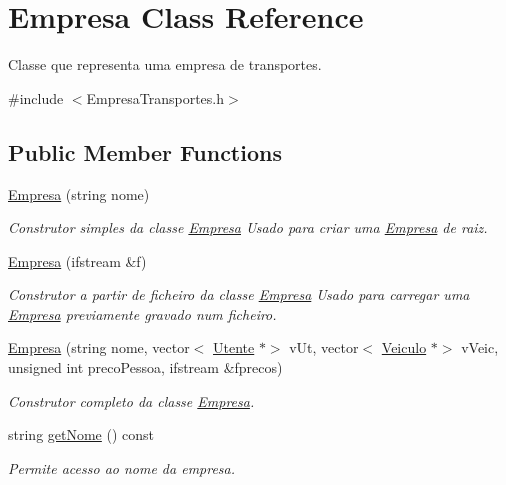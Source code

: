 \hypertarget{class_empresa}{}\section{Empresa Class Reference}
\label{class_empresa}


Classe que representa uma empresa de transportes.  




{\ttfamily \#include $<$Empresa\+Transportes.\+h$>$}

\subsection*{Public Member Functions}
\begin{DoxyCompactItemize}
\item 
\mbox{\hyperlink{class_empresa_ac5bccaf3758b25fea4803a63d4362236}{Empresa}} (string nome)
\begin{DoxyCompactList}\small\item\em Construtor simples da classe \mbox{\hyperlink{class_empresa}{Empresa}} Usado para criar uma \mbox{\hyperlink{class_empresa}{Empresa}} de raiz. \end{DoxyCompactList}\item 
\mbox{\hyperlink{class_empresa_a3eabce52f65fae491d7b3dc28d6eb6e5}{Empresa}} (ifstream \&f)
\begin{DoxyCompactList}\small\item\em Construtor a partir de ficheiro da classe \mbox{\hyperlink{class_empresa}{Empresa}} Usado para carregar uma \mbox{\hyperlink{class_empresa}{Empresa}} previamente gravado num ficheiro. \end{DoxyCompactList}\item 
\mbox{\hyperlink{class_empresa_a093f61d3da9863f22291e02cbaed05e7}{Empresa}} (string nome, vector$<$ \mbox{\hyperlink{class_utente}{Utente}} $\ast$$>$ v\+Ut, vector$<$ \mbox{\hyperlink{class_veiculo}{Veiculo}} $\ast$$>$ v\+Veic, unsigned int preco\+Pessoa, ifstream \&fprecos)
\begin{DoxyCompactList}\small\item\em Construtor completo da classe \mbox{\hyperlink{class_empresa}{Empresa}}. \end{DoxyCompactList}\item 
string \mbox{\hyperlink{class_empresa_af18ca7018ca4771c59ee3b36bc6c213b}{get\+Nome}} () const
\begin{DoxyCompactList}\small\item\em Permite acesso ao nome da empresa. \end{DoxyCompactList}\item 

\end{DoxyCompactItemize}

